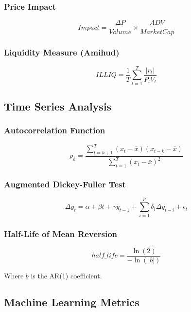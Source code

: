 \documentclass[11pt,letterpaper]{book}
\begin{document}
\subsubsection{Price Impact}
\begin{equation}
Impact = \frac{\Delta P}{Volume} \times \frac{ADV}{MarketCap}
\end{equation}

\subsubsection{Liquidity Measure (Amihud)}
\begin{equation}
ILLIQ = \frac{1}{T} \sum_{t=1}^T \frac{|r_t|}{P_t V_t}
\end{equation}

\subsection{Time Series Analysis}

\subsubsection{Autocorrelation Function}
\begin{equation}
\rho_k = \frac{\sum_{t=k+1}^T (x_t - \bar{x})(x_{t-k} - \bar{x})}{\sum_{t=1}^T (x_t - \bar{x})^2}
\end{equation}

\subsubsection{Augmented Dickey-Fuller Test}
\begin{equation}
\Delta y_t = \alpha + \beta t + \gamma y_{t-1} + \sum_{i=1}^p \delta_i \Delta y_{t-i} + \epsilon_t
\end{equation}

\subsubsection{Half-Life of Mean Reversion}
\begin{equation}
half\_life = \frac{\ln(2)}{-\ln(|b|)}
\end{equation}

Where $b$ is the AR(1) coefficient.

\subsection{Machine Learning Metrics}
\end{document}
